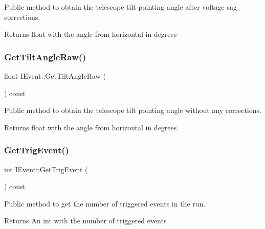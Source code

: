 Public method to obtain the telescope tilt pointing angle after voltage sag corrections. 

\begin{DoxyReturn}{Returns}
float with the angle from horizontal in degrees 
\end{DoxyReturn}
\mbox{\label{classIEvent_a460b04b92872b5b4ff27441fae769476}} 
\subsubsection{\texorpdfstring{Get\+Tilt\+Angle\+Raw()}{GetTiltAngleRaw()}}
{\footnotesize\ttfamily float I\+Event\+::\+Get\+Tilt\+Angle\+Raw (\begin{DoxyParamCaption}{ }\end{DoxyParamCaption}) const}



Public method to obtain the telescope tilt pointing angle without any corrections. 

\begin{DoxyReturn}{Returns}
float with the angle from horizontal in degrees 
\end{DoxyReturn}
\mbox{\label{classIEvent_a773e95dbb87039b7c90f22504a2c20c4}} 
\subsubsection{\texorpdfstring{Get\+Trig\+Event()}{GetTrigEvent()}}
{\footnotesize\ttfamily int I\+Event\+::\+Get\+Trig\+Event (\begin{DoxyParamCaption}{ }\end{DoxyParamCaption}) const}



Public method to get the number of triggered events in the run. 

\begin{DoxyReturn}{Returns}
An int with the number of triggered events 
\end{DoxyReturn}
\mbox{\label{classIEvent_a6b3078eccf01ac33208ef2570aa7565b}} 
